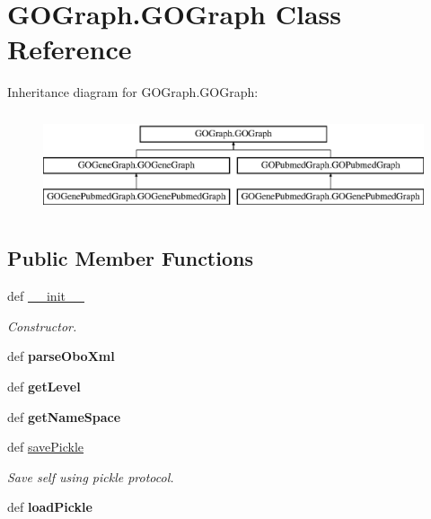 \hypertarget{class_g_o_graph_1_1_g_o_graph}{
\section{GOGraph.GOGraph Class Reference}
\label{class_g_o_graph_1_1_g_o_graph}
}
Inheritance diagram for GOGraph.GOGraph:\begin{figure}[H]
\begin{center}
\leavevmode
\includegraphics[height=2.978723cm]{class_g_o_graph_1_1_g_o_graph}
\end{center}
\end{figure}
\subsection*{Public Member Functions}
\begin{DoxyCompactItemize}
\item 
def \hyperlink{class_g_o_graph_1_1_g_o_graph_afc10d41165dd1ae6c4cce09102542122}{\_\-\_\-init\_\-\_\-}
\begin{DoxyCompactList}\small\item\em Constructor. \item\end{DoxyCompactList}\item 
\hypertarget{class_g_o_graph_1_1_g_o_graph_ac368b1e74799f1947d195e3e2bf7074c}{
def {\bfseries parseOboXml}}
\label{class_g_o_graph_1_1_g_o_graph_ac368b1e74799f1947d195e3e2bf7074c}

\item 
\hypertarget{class_g_o_graph_1_1_g_o_graph_aff70b5975f6e755e3304cfc3d4ef91a0}{
def {\bfseries getLevel}}
\label{class_g_o_graph_1_1_g_o_graph_aff70b5975f6e755e3304cfc3d4ef91a0}

\item 
\hypertarget{class_g_o_graph_1_1_g_o_graph_aeef340ff2a82454a8d92d9711fd7a92b}{
def {\bfseries getNameSpace}}
\label{class_g_o_graph_1_1_g_o_graph_aeef340ff2a82454a8d92d9711fd7a92b}

\item 
def \hyperlink{class_g_o_graph_1_1_g_o_graph_ad97c179c4ec3d79a3092810ba1fbc241}{savePickle}
\begin{DoxyCompactList}\small\item\em Save self using pickle protocol. \item\end{DoxyCompactList}\item 
\hypertarget{class_g_o_graph_1_1_g_o_graph_ada6b7d590cfca9d4baec8d082577ac21}{
def {\bfseries loadPickle}}
\label{class_g_o_graph_1_1_g_o_graph_ada6b7d590cfca9d4baec8d082577ac21}

\end{DoxyCompactItemize}
